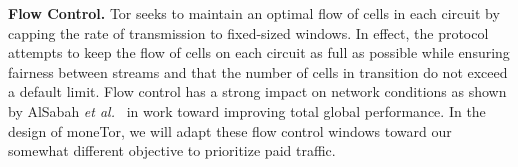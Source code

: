 \medskip
\noindent\textbf{Flow Control.}
Tor seeks to maintain an optimal flow of cells in
each circuit by capping the rate of transmission to fixed-sized windows.
In effect, the protocol attempts to keep the flow of cells on each circuit as
full as possible while ensuring fairness between streams and that the number of
cells in transition do not exceed a default limit. Flow control has a
strong impact on network conditions as shown by AlSabah \textit{et
  al.}~\cite{pets2011-defenestrator} in work toward improving total global
performance. In the design of moneTor, we will adapt these flow control windows
toward our somewhat different objective to prioritize paid traffic.




%

